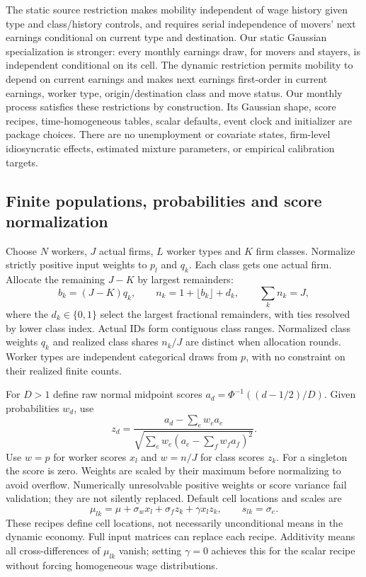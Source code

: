 \documentclass[11pt,letterpaper]{article}
\begin{document}
The static source restriction makes mobility independent of wage history given
type and class/history controls, and requires serial independence of movers'
next earnings conditional on current type and destination. Our static Gaussian
specialization is stronger: every monthly earnings draw, for movers and
stayers, is independent conditional on its cell. The dynamic restriction permits
mobility to depend on current earnings and makes next earnings first-order in
current earnings, worker type, origin/destination class and move status.
Our monthly process satisfies these restrictions by construction. Its Gaussian
shape, score recipes, time-homogeneous tables, scalar defaults, event clock and
initializer are package choices. There are no unemployment or covariate states,
firm-level idiosyncratic effects, estimated mixture parameters, or empirical
calibration targets.

\subsection{Finite populations, probabilities and score normalization}
Choose $N$ workers, $J$ actual firms, $L$ worker types and $K$ firm classes.
Normalize strictly positive input weights to $p_l$ and $q_k$. Each class gets
one actual firm. Allocate the remaining $J-K$ by largest remainders:
\[
 b_k=(J-K)q_k,\qquad n_k=1+\lfloor b_k\rfloor+d_k,
 \qquad \sum_k n_k=J,
\]
where the $d_k\in\{0,1\}$ select the largest fractional remainders, with ties
resolved by lower class index. Actual IDs form contiguous class ranges.
Normalized class weights $q_k$ and realized class shares $n_k/J$ are distinct
when allocation rounds. Worker types are independent categorical draws from
$p$, with no constraint on their realized finite counts.

For $D>1$ define raw normal midpoint scores
$a_d=\Phi^{-1}((d-1/2)/D)$. Given probabilities $w_d$, use
\[
 z_d=\frac{a_d-\sum_e w_e a_e}
 {\sqrt{\sum_e w_e(a_e-\sum_f w_f a_f)^2}}.
\]
Use $w=p$ for worker scores $x_l$ and $w=n/J$ for class scores $z_k$.
For a singleton the score is zero. Weights are scaled by their maximum before
normalizing to avoid overflow. Numerically unresolvable positive weights or
score variance fail validation; they are not silently replaced.
Default cell locations and scales are
\[
 \mu_{lk}=\mu+\sigma_w x_l+\sigma_f z_k+\gamma x_lz_k,
 \qquad s_{lk}=\sigma_e.
\]
These recipes define cell locations, not necessarily unconditional means in the
dynamic economy. Full input matrices can replace each recipe. Additivity means
all cross-differences of $\mu_{lk}$ vanish; setting $\gamma=0$ achieves this
for the scalar recipe without forcing homogeneous wage distributions.
\end{document}
